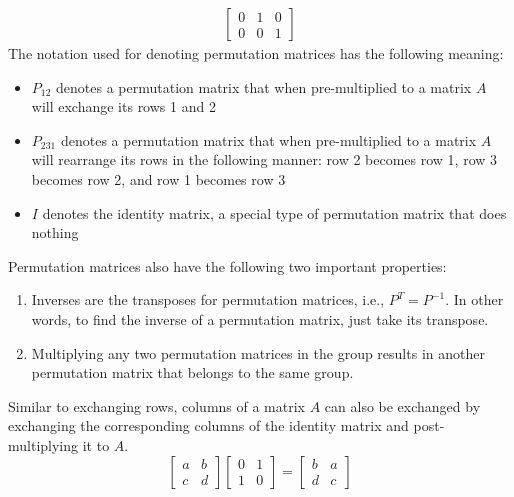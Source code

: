 \documentclass[../main.tex]{subfiles}
\begin{document}
{\[\begin{gathered}
\begin{bmatrix}
                0 & 1 & 0 \\
                0 & 0 & 1
            \end{bmatrix}
        \end{gathered}
    \]
    The notation used for denoting permutation matrices has the following meaning:
    \begin{itemize}
        \item $P_{12}$ denotes a permutation matrix that when pre-multiplied to a matrix $A$ will exchange its rows 1 and 2
        \item $P_{231}$ denotes a permutation matrix that when pre-multiplied to a matrix $A$ will rearrange its rows in the following manner: row 2 becomes row 1, row 3 becomes row 2, and row 1 becomes row 3
        \item $I$ denotes the identity matrix, a special type of permutation matrix that does nothing
    \end{itemize}
    Permutation matrices also have the following two important properties:
    \begin{enumerate}[label = Property \arabic*., itemindent = *]
        \item Inverses are the transposes for permutation matrices, i.e., $P^{T} = P^{-1}$. In other words, to find the inverse of a permutation matrix, just take its transpose.
        \item Multiplying any two permutation matrices in the group results in another permutation matrix that belongs to the same group.
    \end{enumerate}
    Similar to exchanging rows, columns of a matrix $A$ can also be exchanged by exchanging the corresponding columns of the identity matrix and post-multiplying it to $A$.
    \[
        \begin{bmatrix}
            a & b \\
            c & d
        \end{bmatrix}
        \begin{bmatrix}
            0 & 1 \\
            1 & 0
        \end{bmatrix}
        =
        \begin{bmatrix}
            b & a \\
            d & c
        \end{bmatrix}
    \]
}

\onlyinsubfile{\end{multicols*}}
\end{document}
